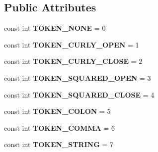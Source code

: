 \subsection*{\-Public \-Attributes}
\begin{DoxyCompactItemize}
\item 
\hypertarget{classProcurios_1_1Public_1_1JSON_af7c99e6bcc6e07c3fcceb1271f79f382}{const int {\bfseries \-T\-O\-K\-E\-N\-\_\-\-N\-O\-N\-E} = 0}\label{classProcurios_1_1Public_1_1JSON_af7c99e6bcc6e07c3fcceb1271f79f382}

\item 
\hypertarget{classProcurios_1_1Public_1_1JSON_aa3c331c741e9b07d0449cd3d693e1713}{const int {\bfseries \-T\-O\-K\-E\-N\-\_\-\-C\-U\-R\-L\-Y\-\_\-\-O\-P\-E\-N} = 1}\label{classProcurios_1_1Public_1_1JSON_aa3c331c741e9b07d0449cd3d693e1713}

\item 
\hypertarget{classProcurios_1_1Public_1_1JSON_af32234ab5b100343e0c6d09e93170ffc}{const int {\bfseries \-T\-O\-K\-E\-N\-\_\-\-C\-U\-R\-L\-Y\-\_\-\-C\-L\-O\-S\-E} = 2}\label{classProcurios_1_1Public_1_1JSON_af32234ab5b100343e0c6d09e93170ffc}

\item 
\hypertarget{classProcurios_1_1Public_1_1JSON_ae09402645e8eacd35ce053eafd576b61}{const int {\bfseries \-T\-O\-K\-E\-N\-\_\-\-S\-Q\-U\-A\-R\-E\-D\-\_\-\-O\-P\-E\-N} = 3}\label{classProcurios_1_1Public_1_1JSON_ae09402645e8eacd35ce053eafd576b61}

\item 
\hypertarget{classProcurios_1_1Public_1_1JSON_af5ab190a671a78c7174ac2605333bff3}{const int {\bfseries \-T\-O\-K\-E\-N\-\_\-\-S\-Q\-U\-A\-R\-E\-D\-\_\-\-C\-L\-O\-S\-E} = 4}\label{classProcurios_1_1Public_1_1JSON_af5ab190a671a78c7174ac2605333bff3}

\item 
\hypertarget{classProcurios_1_1Public_1_1JSON_ab68ed1d0266e58b25aca047c787ca03a}{const int {\bfseries \-T\-O\-K\-E\-N\-\_\-\-C\-O\-L\-O\-N} = 5}\label{classProcurios_1_1Public_1_1JSON_ab68ed1d0266e58b25aca047c787ca03a}

\item 
\hypertarget{classProcurios_1_1Public_1_1JSON_a7e32ab85eea665624a0495581e48e467}{const int {\bfseries \-T\-O\-K\-E\-N\-\_\-\-C\-O\-M\-M\-A} = 6}\label{classProcurios_1_1Public_1_1JSON_a7e32ab85eea665624a0495581e48e467}

\item 
\hypertarget{classProcurios_1_1Public_1_1JSON_a1830251b442ff565dce2f972225caee3}{const int {\bfseries \-T\-O\-K\-E\-N\-\_\-\-S\-T\-R\-I\-N\-G} = 7}\label{classProcurios_1_1Public_1_1JSON_a1830251b442ff565dce2f972225caee3}


\end{DoxyCompactItemize}
